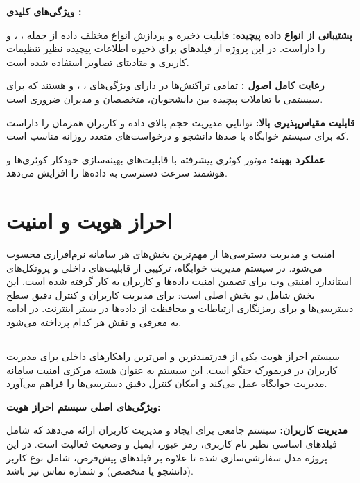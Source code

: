 \documentclass[12pt,a4paper]{report}
\begin{document}
	\textbf{ویژگی‌های کلیدی :}
	
	\textbf{پشتیبانی از انواع داده پیچیده:}  قابلیت ذخیره و پردازش انواع مختلف داده از جمله ، ،  و  را داراست. در این پروژه از فیلدهای  برای ذخیره اطلاعات پیچیده نظیر تنظیمات کاربری و متادیتای تصاویر استفاده شده است.
	
	\textbf{رعایت کامل اصول :} تمامی تراکنش‌ها در  دارای ویژگی‌های ، ،  و  هستند که برای سیستمی با تعاملات پیچیده بین دانشجویان، متخصصان و مدیران ضروری است.
	
	\textbf{قابلیت مقیاس‌پذیری بالا:}  توانایی مدیریت حجم بالای داده و کاربران همزمان را داراست که برای سیستم خوابگاه با صدها دانشجو و درخواست‌های متعدد روزانه مناسب است.
	
	\textbf{عملکرد بهینه:} موتور کوئری پیشرفته  با قابلیت‌های بهینه‌سازی خودکار کوئری‌ها و  هوشمند سرعت دسترسی به داده‌ها را افزایش می‌دهد.
	
	\section{احراز هویت و امنیت}
	امنیت و مدیریت دسترسی‌ها از مهم‌ترین بخش‌های هر سامانه نرم‌افزاری محسوب می‌شود. در سیستم مدیریت خوابگاه، ترکیبی از قابلیت‌های داخلی  و پروتکل‌های استاندارد امنیتی وب برای تضمین امنیت داده‌ها و کاربران به کار گرفته شده است. این بخش شامل دو بخش اصلی است: \textbf{} برای مدیریت کاربران و کنترل دقیق سطح دسترسی‌ها و \textbf{} برای رمزنگاری ارتباطات و محافظت از داده‌ها در بستر اینترنت. در ادامه به معرفی و نقش هر کدام پرداخته می‌شود.
	
	\subsection{}
	سیستم احراز هویت  یکی از قدرتمندترین و امن‌ترین راهکارهای داخلی برای مدیریت کاربران در فریمورک جنگو است. این سیستم به عنوان هسته مرکزی امنیت سامانه مدیریت خوابگاه عمل می‌کند و امکان کنترل دقیق دسترسی‌ها را فراهم می‌آورد.
	
	\textbf{ویژگی‌های اصلی سیستم احراز هویت:}
	
	\textbf{مدیریت کاربران:}  سیستم جامعی برای ایجاد و مدیریت کاربران ارائه می‌دهد که شامل فیلدهای اساسی نظیر نام کاربری، رمز عبور، ایمیل و وضعیت فعالیت است. در این پروژه مدل  سفارشی‌سازی شده تا علاوه بر فیلدهای پیش‌فرض، شامل نوع کاربر (دانشجو یا متخصص) و شماره تماس نیز باشد.
	
\end{document}
